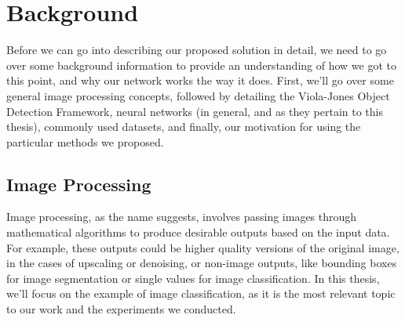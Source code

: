 \documentclass[11pt,a4paper,oldfontcommands]{memoir}
\begin{document}





\chapter{Background}
Before we can go into describing our proposed solution in detail, we need to go over some background information to provide an understanding of how we got to this point, and why our network works the way it does. First, we'll go over some general image processing concepts, followed by detailing the Viola-Jones Object Detection Framework, neural networks (in general, and as they pertain to this thesis), commonly used datasets, and finally, our motivation for using the particular methods we proposed.

\section{Image Processing}
Image processing, as the name suggests, involves passing images through mathematical algorithms to produce desirable outputs based on the input data. For example, these outputs could be higher quality versions of the original image, in the cases of upscaling or denoising, or non-image outputs, like bounding boxes for image segmentation or single values for image classification. In this thesis, we'll focus on the example of image classification, as it is the most relevant topic to our work and the experiments we conducted.
\end{document}
